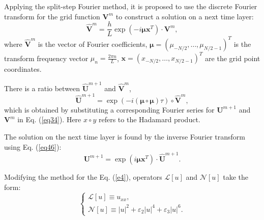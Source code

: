 \documentclass[preprint,12pt]{elsarticle}
\begin{document}
Applying the split-step Fourier method, it is proposed to use the discrete Fourier transform for the grid function \(\boldsymbol{V}^m\) to construct a solution on a next time layer:
\begin{equation} 
\hat{\boldsymbol{V}}^m=\frac{h}{L}\exp\left(-i \boldsymbol{\mu} \boldsymbol{x}^{T}\right)\cdot \boldsymbol{V}^{m},
\end{equation}
where \(\hat{\boldsymbol{V}}^m\) is the vector of Fourier coefficients, \(\boldsymbol{\mu}=\left(\mu_{-N/2},\ldots,\mu_{N/2-1}\right)^{T}\) is the transform frequency vector \(\mu_{n}=\frac{2\pi n}{L}\), \(\boldsymbol{x}=\left(x_{-N/2},\ldots,x_{N/2-1}\right)^{T}\) are the grid point coordinates.

There is a ratio between \(\hat{\boldsymbol{U}}^{m+1}\) and \(\hat{\boldsymbol{V}}^{m}\),
\begin{equation} \label{eq46}
\hat{\boldsymbol{U}}^{m+1}=\exp\left(-i \left(\boldsymbol{\mu}\circ \boldsymbol{\mu}\right) \tau\right)\circ \hat{\boldsymbol{V}}^{m},
\end{equation}
which is obtained by substituting a corresponding Fourier series for \(\boldsymbol{U}^{m+1}\) and \(\boldsymbol{V}^{m}\) in Eq. (\ref{eq34}). Here \(x\circ y\) refers to the Hadamard product.

The solution on the next time layer is found by the inverse Fourier transform using Eq. (\ref{eq46}):
\begin{equation} 
\boldsymbol{U}^{m+1}=\exp\left(i \boldsymbol{\mu} \boldsymbol{x}^{T}\right)\cdot \hat{\boldsymbol{U}}^{m+1}.
\end{equation}

Modifying the method for the Eq. (\ref{e4}), operators \(\mathscr{L} [u]\) and \(\mathscr{N}[u]\) take the form:
\begin{equation}
\begin{cases}
\mathscr{L} [u] \equiv u_{xx},  \\
\mathscr{N} [u] \equiv |u|^2+ \varepsilon_{2}|u|^4+ \varepsilon_{3}|u|^6.
\end{cases}
\end{equation}
\end{document}
